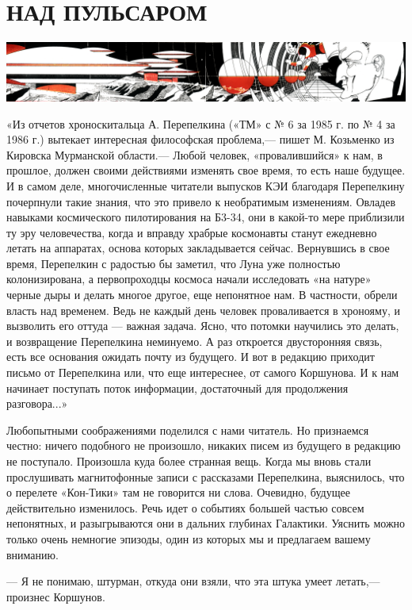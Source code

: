 \documentclass[11pt,a4paper,oneside]{article}
\begin{document}
\section{НАД ПУЛЬСАРОМ}
\includegraphics[width=\textwidth]{pulsar}

«Из отчетов хроноскитальца А. Перепелкина («ТМ» с № 6 за 1985 г. по № 4 за 1986 г.) вытекает интересная философская проблема,— пишет М. Козьменко из Кировска Мурманской области.— Любой человек, «провалившийся» к нам, в прошлое, должен своими действиями изменять свое время, то есть наше будущее. И в самом деле, многочисленные читатели выпусков КЭИ благодаря Перепелкину почерпнули такие знания, что это привело к необратимым изменениям. Овладев навыками космического пилотирования на Б3-34, они в какой-то мере приблизили ту эру человечества, когда и вправду храбрые космонавты станут ежедневно летать на аппаратах, основа которых закладывается сейчас. Вернувшись в свое время, Перепелкин с радостью бы заметил, что Луна уже полностью колонизирована, а первопроходцы космоса начали исследовать «на натуре» черные дыры и делать многое другое, еще непонятное нам. В частности, обрели власть над временем. Ведь не каждый день человек проваливается в хронояму, и вызволить его оттуда — важная задача. Ясно, что потомки научились это делать, и возвращение Перепелкина неминуемо. А раз откроется двусторонняя связь, есть все основания ожидать почту из будущего. И вот в редакцию приходит письмо от Перепелкина или, что еще интереснее, от самого Коршунова. И к нам начинает поступать поток информации, достаточный для продолжения разговора...»

Любопытными соображениями поделился с нами читатель. Но признаемся честно: ничего подобного не произошло, никаких писем из будущего в редакцию не поступало. Произошла куда более странная вещь. Когда мы вновь стали прослушивать магнитофонные записи с рассказами Перепелкина, выяснилось, что о перелете «Кон-Тики» там не говорится ни слова. Очевидно, будущее действительно изменилось. Речь идет о событиях большей частью совсем непонятных, и разыгрываются они в дальних глубинах Галактики. Уяснить можно только очень немногие эпизоды, один из которых мы и предлагаем вашему вниманию.

— Я не понимаю, штурман, откуда они взяли, что эта штука умеет летать,— произнес Коршунов.
\end{document}
